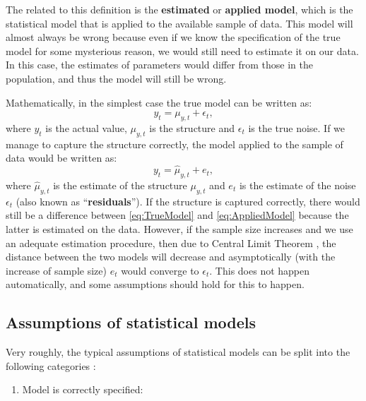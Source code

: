 \documentclass[
]{book}
\providecommand{\tightlist}{%
  \setlength{\itemsep}{0pt}\setlength{\parskip}{0pt}}
\theoremstyle{definition}
\theoremstyle{definition}
\theoremstyle{definition}
\theoremstyle{definition}
\theoremstyle{remark}
\begin{document}
The related to this definition is the \textbf{estimated} or \textbf{applied model}, which is the statistical model that is applied to the available sample of data. This model will almost always be wrong because even if we know the specification of the true model for some mysterious reason, we would still need to estimate it on our data. In this case, the estimates of parameters would differ from those in the population, and thus the model will still be wrong.

Mathematically, in the simplest case the true model can be written as:
\begin{equation}
    y_t = \mu_{y,t} + \epsilon_t,
    \label{eq:TrueModel}
\end{equation}
where \(y_t\) is the actual value, \(\mu_{y,t}\) is the structure and \(\epsilon_t\) is the true noise. If we manage to capture the structure correctly, the model applied to the sample of data would be written as:
\begin{equation}
    y_t = \hat{\mu}_{y,t} + e_t,
    \label{eq:AppliedModel}
\end{equation}
where \(\hat{\mu}_{y,t}\) is the estimate of the structure \(\mu_{y,t}\) and \(e_t\) is the estimate of the noise \(\epsilon_t\) (also known as ``\textbf{residuals}''). If the structure is captured correctly, there would still be a difference between \eqref{eq:TrueModel} and \eqref{eq:AppliedModel} because the latter is estimated on the data. However, if the sample size increases and we use an adequate estimation procedure, then due to Central Limit Theorem \citep[see Chapter 4 of][]{SvetunkovSBA}, the distance between the two models will decrease and asymptotically (with the increase of sample size) \(e_t\) would converge to \(\epsilon_t\). This does not happen automatically, and some assumptions should hold for this to happen.

\hypertarget{assumptions}{%
\subsection{Assumptions of statistical models}\label{assumptions}}

Very roughly, the typical assumptions of statistical models can be split into the following categories \citep{SvetunkovSBA}:

\begin{enumerate}
\def\labelenumi{\arabic{enumi}.}
\tightlist
\item
  Model is correctly specified:
\end{enumerate}
\end{document}
